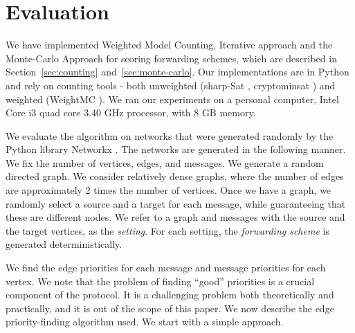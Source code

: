 \documentclass[11pt,eepic]{article}
\begin{document}
\section{Evaluation}
	\label{sec:eval}
	We have implemented Weighted Model Counting, Iterative approach and the Monte-Carlo Approach for scoring forwarding schemes, which are described in Section~\ref{sec:counting} and~\ref{sec:monte-carlo}. Our implementations are in Python and rely on counting tools - both unweighted (sharp-Sat \cite{sharpSat}, cryptominsat \cite{cryptominsat}) and weighted (WeightMC \cite{WeightMC}). We ran our experiments on a personal computer, Intel Core i3 quad core 3.40 GHz processor, with 8 GB memory.

		We evaluate the algorithm on networks that were generated randomly by the Python library Networkx
		 \cite{HSS08}.
		The networks are generated in the following manner.
		We fix the number of vertices, edges, and messages.
		We generate a random directed graph.
		We consider relatively dense graphs, where the number of edges are approximately 2 times the number of vertices.
		Once we have a graph, we randomly select a source and a target for each message,
		while guaranteeing that these are different nodes.
		We refer to a graph and messages with the source and the target vertices, 
		as the {\em setting}.
		For each setting, the {\em forwarding scheme} is generated deterministically.

		We find the edge priorities for each message and message priorities for each vertex. We note that the problem of finding ``good'' priorities is a crucial component of the protocol. It is a challenging problem both theoretically and practically, and it is out of the scope of this paper. We now describe the edge priority-finding algorithm used. We start with a simple approach.
\end{document}
